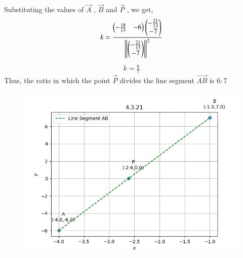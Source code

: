 \documentclass[journal]{IEEEtran}
\numberwithin{equation}{enumi}
\numberwithin{figure}{enumi}
\begin{document}
Substituting the values of $\vec{A}$ , $\vec{B}$ and $\vec{P}$ , we get,
\begin{align}
    k = \frac{\begin{pmatrix}-\frac{18}{13}& -6\end{pmatrix} \begin{pmatrix}-\frac{21}{13} \\ -7 \end{pmatrix}}{\left\lVert\begin{pmatrix}-\frac{21}{13} \\ -7\end{pmatrix}\right\rVert^2}
\end{align}
\begin{align}
    k = \frac{6}{7}
\end{align}
Thus,  the ratio in which the point $\vec{P}$ divides the line segment $\vec{AB}$ is $6\colon7$

\begin{figure}[H]
    \centering
    \includegraphics[width=1.0\columnwidth]{figs/section1.png}
    \caption*{}
    \label{fig:}
\end{figure}
\end{document}
